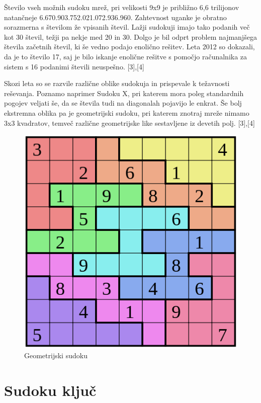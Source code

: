 \documentclass[A4paper, 11pt]{article}
\begin{document}

Število vseh možnih sudoku mrež, pri velikosti 9x9 je približno 6,6 trilijonov natančneje 6.670.903.752.021.072.936.960. 
Zahtevnost uganke je obratno sorazmerna s številom že vpisanih števil. Lažji sudokuji imajo tako podanih več kot 30 števil, težji pa nekje med 20 in 30. Dolgo je bil odprt problem najmanjšega števila začetnih števil, ki še vedno podajo enolično rešitev. Leta 2012 so dokazali, da je to število 17, saj je bilo iskanje enolične rešitve s pomočjo računalnika za sistem s 16 podanimi števili neuspešno. [3],[4]

Skozi leta so se razvile različne oblike sudokuja in prispevale k težavnosti reševanja. Poznamo naprimer Sudoku X, pri katerem mora poleg standardnih pogojev veljati še, da se števila tudi na diagonalah pojavijo le enkrat. Še bolj ekstremna oblika pa je geometrijski sudoku, pri katerem znotraj mreže nimamo 3x3 kvadratov, temveč različne geometrijske like sestavljene iz devetih polj. [3],[4]

\begin{figure}[h]
\centering
\caption{Geometrijski sudoku}
\includegraphics[scale=0.4]{geo_sudoku}
\end{figure}


\section{Sudoku ključ}
\end{document}

